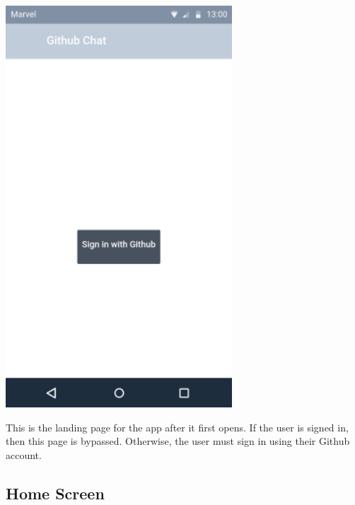 \documentclass{report}
\begin{document}
\begin{center}
    \includegraphics[scale=0.5]{design-login}
\end{center}
This is the landing page for the app after it first opens. If the user is signed in, then this page is bypassed. Otherwise, the user must sign in using their Github account.

\newpage
\subsection{Home Screen}
\end{document}
